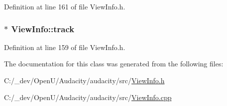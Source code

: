 Definition at line 161 of file View\+Info.\+h.

\subsubsection[{\texorpdfstring{track}{track}}]{$\ast$ View\+Info\+::track}\hypertarget{class_view_info_a3f883252ed37f0863113e0e20afc70e2}{}\label{class_view_info_a3f883252ed37f0863113e0e20afc70e2}


Definition at line 159 of file View\+Info.\+h.



The documentation for this class was generated from the following files\+:\begin{DoxyCompactItemize}
\item 
C\+:/\+\_\+dev/\+Open\+U/\+Audacity/audacity/src/\hyperlink{_view_info_8h}{View\+Info.\+h}\item 
C\+:/\+\_\+dev/\+Open\+U/\+Audacity/audacity/src/\hyperlink{_view_info_8cpp}{View\+Info.\+cpp}\end{DoxyCompactItemize}
